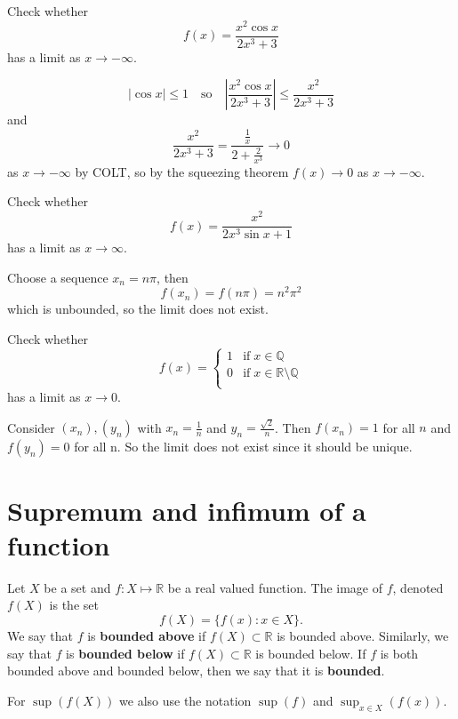 \begin{example}
    Check whether \[f(x)=\dfrac{x^2\cos{x}}{2x^3+3}\] has a limit as $x\to-\infty$.
    
    \[|\cos{x}|\leq1\quad\text{so}\quad\left|\dfrac{x^2\cos{x}}{2x^3+3}\right|\leq \dfrac{x^2}{2x^3+3}\] and \[\dfrac{x^2}{2x^3+3}=\dfrac{\frac1x}{2+\frac2{x^3}}\to0\] as $x\to-\infty$ by COLT, so by the squeezing theorem $f(x)\to0$ as $x\to-\infty$.
\end{example}

\begin{example}
    Check whether \[f(x)=\dfrac{x^2}{2x^3\sin{x}+1}\] has a limit as $x\to\infty$.
    
    Choose a sequence $x_n=n\pi$, then \[f(x_n)=f(n\pi)=n^2\pi^2\] which is unbounded, so the limit does not exist.
\end{example}

\begin{example}
    Check whether 
    \[
        f(x)=
        \begin{cases}
            1&\text{if}\;x\in\mathbb Q\\
            0&\text{if}\;x\in\mathbb R\setminus\mathbb Q\\
        \end{cases}
    \]
    has a limit as $x\to0$.
    
    Consider $(x_n),(y_n)$ with $x_n=\frac1n$ and $y_n=\frac{\sqrt2}n$. Then $f(x_n)=1$ for all $n$ and $f(y_n)=0$ for all n. So the limit does not exist since it should be unique.
\end{example}

\section{Supremum and infimum of a function}

\begin{definition}
    Let $X$ be a set and $f:X\mapsto\mathbb R$ be a real valued function. The image of $f$, denoted $f(X)$ is the set \[f(X)=\{f(x):x\in X\}.\] We say that $f$ is \textbf{bounded above} if $f(X)\subset\mathbb R$ is bounded above. Similarly, we say that $f$ is \textbf{bounded below} if $f(X)\subset\mathbb R$ is bounded below. If $f$ is both bounded above and bounded below, then we say that it is \textbf{bounded}.
    
    For $\sup{(f(X))}$ we also use the notation $\sup{(f)}$ and $\sup_{x\in X}(f(x))$.
\end{definition}

